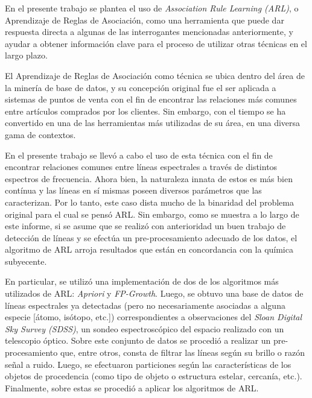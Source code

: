 \begin{intro}
En el presente trabajo se plantea el uso de \textit{Association Rule Learning (ARL)}, o Aprendizaje de Reglas de Asociación, como una herramienta que puede dar respuesta directa a algunas de las interrogantes mencionadas anteriormente, y ayudar a obtener información clave para el proceso de utilizar otras técnicas en el largo plazo.

El Aprendizaje de Reglas de Asociación como técnica se ubica dentro del área de la minería de base de datos, y su concepción original fue el ser aplicada a sistemas de puntos de venta con el fin de encontrar las relaciones más comunes entre artículos comprados por los clientes. Sin embargo, con el tiempo se ha convertido en una de las herramientas más utilizadas de su área, en una diversa gama de contextos.

En el presente trabajo se llevó a cabo el uso de esta técnica con el fin de encontrar relaciones comunes entre líneas espectrales a través de distintos espectros de frecuencia. Ahora bien, la naturaleza innata de estos es más bien contínua y las líneas en sí mismas poseen diversos parámetros que las caracterizan. Por lo tanto, este caso dista mucho de la binaridad del problema original para el cual se pensó ARL. Sin embargo, como se muestra a lo largo de este informe, si se asume que se realizó con anterioridad un buen trabajo de detección de líneas y se efectúa un pre-procesamiento adecuado de los datos, el algoritmo de ARL arroja resultados que están en concordancia con la química subyecente.

En particular, se utilizó una implementación de dos de los algoritmos más utilizados de ARL: \textit{Apriori} y \textit{FP-Growth}. Luego, se obtuvo una base de datos de líneas espectrales ya detectadas (pero no necesariamente asociadas a alguna especie [átomo, isótopo, etc.]) correspondientes a observaciones del \textit{Sloan Digital Sky Survey (SDSS)}, un sondeo espectroscópico del espacio realizado con un telescopio óptico. Sobre este conjunto de datos se procedió a realizar un pre-procesamiento que, entre otros, consta de filtrar las líneas según su brillo o razón señal a ruido. Luego, se efectuaron particiones según las características de los objetos de procedencia (como tipo de objeto o estructura estelar, cercanía, etc.). Finalmente, sobre estas se procedió a aplicar los algoritmos de ARL.


\end{intro}
